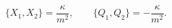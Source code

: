 \begin{equation}
     \big\{X_{1},X_{2}\big\}=\frac{\kappa}{m^2},
     \qquad
     \big\{Q_{1},Q_{2}\big\}=-\frac{\kappa}{m^2}.
     \label{NCCR}
\end{equation}

